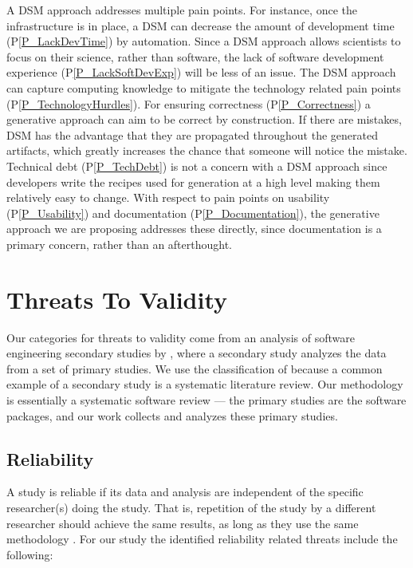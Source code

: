 \documentclass[final, 3p, times, authoryear]{elsarticle}
\newcommand{\ppref}[1]{P\ref{#1}}
\begin{document}
A DSM approach addresses multiple pain points.  For instance, once the
infrastructure is in place, a DSM can decrease the amount of development time
(\ppref{P_LackDevTime}) by automation.  Since a DSM approach allows scientists
to focus on their science, rather than software, the lack of software
development experience (\ppref{P_LackSoftDevExp}) will be less of an issue. The
DSM approach can capture computing knowledge to mitigate the technology related
pain points (\ppref{P_TechnologyHurdles}).  For ensuring correctness
(\ppref{P_Correctness}) a generative approach can aim to be correct by
construction.  If there are mistakes, DSM has the advantage that they are
propagated throughout the generated artifacts, which greatly increases the
chance that someone will notice the mistake.  Technical debt
(\ppref{P_TechDebt}) is not a concern with a DSM approach since developers write
the recipes used for generation at a high level making them relatively easy to
change.  With respect to pain points on usability (\ppref{P_Usability}) and
documentation (\ppref{P_Documentation}), the generative approach we are
proposing addresses these directly, since documentation is a primary concern,
rather than an afterthought.

\section{Threats To Validity} \label{threats}

Our categories for threats to validity come from an analysis of software
engineering secondary studies by \citet{AmpatzoglouEtAl2019}, where a secondary
study analyzes the data from a set of primary studies.  We use the
classification of \citet{AmpatzoglouEtAl2019} because a common example of a
secondary study is a systematic literature review. Our methodology is
essentially a systematic software review --- the primary studies are the
software packages, and our work collects and analyzes these primary studies.

\subsection{Reliability}

A study is reliable if its data and analysis are independent of the specific
researcher(s) doing the study.  That is, repetition of the study by a different
researcher should achieve the same results, as long as they use the same
methodology \citep{RunesonAndHost2009}.  For our study the identified
reliability related threats include the following:
\end{document}
